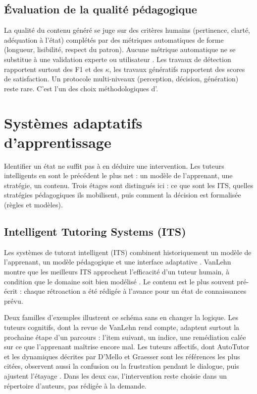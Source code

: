 \subsection{Évaluation de la qualité pédagogique}

La qualité du contenu généré se juge sur des critères humains (pertinence,
clarté, adéquation à l'état) complétés par des métriques automatiques de
forme (longueur, lisibilité, respect du patron). Aucune métrique automatique
ne se substitue à une validation experte ou utilisateur
\cite{kasneci2023chatgpt,hu2025page}. Les travaux de détection rapportent
surtout des F1 et des $\kappa$, les travaux génératifs rapportent des scores
de satisfaction. Un protocole multi-niveaux (perception, décision,
génération) reste rare. C'est l'un des choix méthodologiques d'\emolearn{}.

\section{Systèmes adaptatifs d'apprentissage}
\label{sec:ea-its}

Identifier un état ne suffit pas à en déduire une intervention. Les
tuteurs intelligents en sont le précédent le plus net : un modèle de
l'apprenant, une stratégie, un contenu. Trois étages sont distingués ici :
ce que sont les ITS, quelles stratégies pédagogiques ils mobilisent, puis
comment la décision est formalisée (règles et modèles).

\subsection{Intelligent Tutoring Systems (ITS)}

Les systèmes de tutorat intelligent (ITS) combinent historiquement un modèle
de l'apprenant, un modèle pédagogique et une interface adaptative
\cite{vanlehn2011relative}. VanLehn montre que les meilleurs ITS approchent
l'efficacité d'un tuteur humain, à condition que le domaine soit bien
modélisé \cite{vanlehn2011relative}. Le contenu est le plus souvent
pré-écrit : chaque rétroaction a été rédigée à l'avance pour un état
de connaissances prévu.

Deux familles d'exemples illustrent ce schéma sans en changer la
logique. Les tuteurs cognitifs, dont la revue de VanLehn rend compte,
adaptent surtout la prochaine étape d'un parcours : l'item suivant,
un indice, une remédiation calée sur ce que l'apprenant maîtrise encore
mal. Les tuteurs affectifs, dont AutoTutor et les dynamiques décrites par
D'Mello et Graesser sont les références les plus citées, observent aussi
la confusion ou la frustration pendant le dialogue, puis ajustent
l'étayage \cite{dmello2012dynamics,graesser2020emotions}. Dans les deux cas,
l'intervention reste choisie dans un répertoire d'auteurs, pas rédigée à
la demande.

